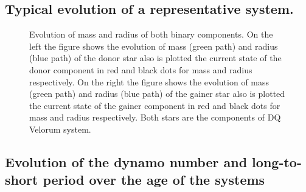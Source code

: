
\subsection{Typical evolution of a representative system.}

\begin{figure}[h!]
  \caption{Evolution of mass and radius of both binary components. On the left the figure shows the evolution of mass (green path) and radius (blue path) of the donor star also is plotted the current state of the donor component in red and black dots for mass and radius respectively. On the right the figure shows the evolution of mass (green path) and radius (blue path) of the gainer star also is plotted the current state of the gainer component in red and black dots for mass and radius respectively. Both stars are the components of DQ Velorum system.}
  \label{dqvel_evolution}
\end{figure}


\subsection{Evolution of the dynamo number and long-to-short period over the age of the systems}
